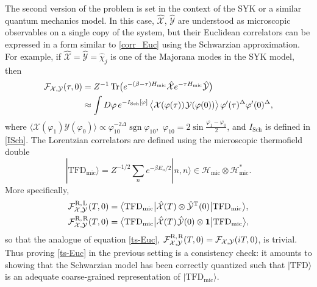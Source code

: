 \documentclass[12pt]{article}
\newcommand{\blangle}{\bigl\langle}
\newcommand{\brangle}{\bigr\rangle}
\newcommand*{\ket}[1]{|{#1}\rangle}
\newcommand*{\bbra}[1]{\blangle{#1}\big|}
\newcommand*{\bket}[1]{\big|{#1}\brangle}
\newcommand*{\corr}[1]{\langle{#1}\rangle}
\newcommand*{\bcorr}[1]{\blangle{#1}\brangle}
\newcommand{\vp}{\varphi}
\newcommand{\calF}{\mathcal{F}}
\newcommand{\calH}{\mathcal{H}}
\newcommand{\calX}{\mathcal{X}}
\newcommand{\calY}{\mathcal{Y}}
\DeclareMathOperator{\Tr}{Tr}
\DeclareMathOperator{\sgn}{sgn}
\newcommand{\Tt}{\mathrm{T}}
\DeclareMathOperator{\Sch}{Sch}
\newcommand{\la}{\text{L}}
\newcommand{\ra}{\text{R}}
\newcommand{\TFD}{\mathrm{TFD}}
\newcommand{\unit}{\mathbf{1}}
\begin{document}
The second version of the problem is set in the context of the SYK or a similar quantum mechanics model. In this case, $\hat{\calX}$, $\hat{\calY}$ are understood as microscopic observables on a single copy of the system, but their Euclidean correlators can be expressed in a form similar to \eqref{corr_Euc} using the Schwarzian approximation. For example, if $\hat{\calX}=\hat{\calY}=\hat{\chi}_j$ is one of the Majorana modes in the SYK model, then
\begin{equation}
\begin{aligned}
\calF_{\calX,\calY}(\tau,0)
&=Z^{-1}\Tr\bigl(e^{-(\beta-\tau)H_{\text{mic}}}\hat{\calX}
e^{-\tau H_{\text{mic}}}\hat{\calY}\bigr)\\
&\approx\int D\vp\,e^{-I_{\Sch}[\vp]}\,
\bcorr{\calX(\vp(\tau))\kern1pt\calY(\vp(0))}\,
\vp'(\tau)^{\Delta}\vp'(0)^{\Delta},
\end{aligned}
\end{equation}
where $\corr{\calX(\vp_1)\calY(\vp_0)} \propto \vp_{10}^{-2\Delta}\sgn\vp_{10}$,\, $\vp_{10}=2\sin\frac{\vp_1-\vp_0}{2}$, and $I_{\Sch}$ is defined in \eqref{ISch}. The Lorentzian correlators are defined using the microscopic thermofield double
\begin{equation}
\ket{\TFD_{\text{mic}}}=Z^{-1/2}\sum_{n}e^{-\beta E_n/2}\ket{n,n}
\in\calH_{\text{mic}}\otimes\calH_{\text{mic}}^{*}.
\end{equation}
More specifically,
\begin{align}
\label{two-sided-mic}
\tensor*{\calF}{*^{\ra,}_{\calX,}^{\la}_{\calY}}(T,0)
&=\bbra{\TFD_\text{mic}}\hat{\calX}(T)\otimes\hat{\calY}^{\Tt}(0)
\bket{\TFD_\text{mic}},
\\
\label{one-sided-mic}
\tensor*{\calF}{*^{\ra,}_{\calX,}^{\ra}_{\calY}}(T,0)
&=\bbra{\TFD_\text{mic}}\hat{\calX}(T)\kern1pt\hat{\calY}(0)
\otimes \unit\bket{\TFD_\text{mic}},
\end{align}
so that the analogue of equation \eqref{ts-Euc}, $\tensor*{\calF}{*^{\ra,}_{\calX,}^{\ra}_{\calY}}(T,0)=\calF_{\calX, \calY}(iT,0)$, is trivial. Thus proving \eqref{ts-Euc} in the previous setting is a consistency check: it amounts to showing that the Schwarzian model has been correctly quantized such that $\ket{\TFD}$ is an adequate coarse-grained representation of $\ket{\TFD_{\text{mic}}}$.
\end{document}
